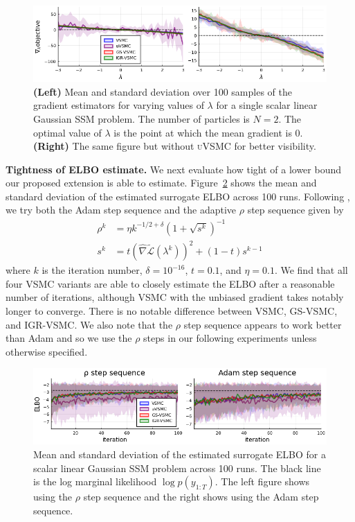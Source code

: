 \documentclass[12pt]{article}
\newcommand{\vsmc}{\textsc{VSMC}\xspace}
\newcommand{\uvsmc}{\textsc{uVSMC}\xspace}
\newcommand{\gsvsmc}{\textsc{GS-VSMC}\xspace}
\newcommand{\igrvsmc}{\textsc{IGR-VSMC}\xspace}
\newcommand{\elbo}{\textsc{ELBO}\xspace}
\newcommand{\ssm}{\textsc{SSM}\xspace}
\begin{document}
\begin{figure}[t]
\centering
\includegraphics[width=\textwidth]{figures/grad_est_var.png}
\caption{\textbf{(Left)} Mean and standard deviation over 100 samples of the gradient estimators for varying values of $\lambda$ for a single scalar linear Gaussian \ssm problem. The number of particles is $N=2$. The optimal value of $\lambda$ is the point at which the mean gradient is 0. \textbf{(Right)} The same figure but without \uvsmc for better visibility.}
\label{fig:grad_est_var}
\end{figure}

\textbf{Tightness of \elbo estimate.} We next evaluate how tight of a lower bound our proposed extension is able to estimate. Figure~\ref{fig:slgss_elbo} shows the mean and standard deviation of the estimated surrogate \elbo across 100 runs. Following \textcite{Naesseth:2018}, we try both the Adam step sequence and the adaptive $\rho$ step sequence \parencite{Kucukelbir:2017} given by
\begin{align*}
\rho^k &= \eta k^{-1/2+\delta}(1+\sqrt{s^k})^{-1} \\
s^k &= t\left(\hat{\nabla}\tilde{\mathcal{L}}(\lambda^k)\right)^2+(1-t)s^{k-1}
\end{align*}
where $k$ is the iteration number, $\delta=10^{-16}$, $t=0.1$, and $\eta=0.1$. We find that all four \vsmc variants are able to closely estimate the \elbo after a reasonable number of iterations, although \vsmc with the unbiased gradient takes notably longer to converge. There is no notable difference between \vsmc, \gsvsmc, and \igrvsmc. We also note that the $\rho$ step sequence appears to work better than Adam and so we use the $\rho$ steps in our following experiments unless otherwise specified.
\\

\begin{figure}[t]
\centering
\includegraphics[width=\textwidth]{figures/slgss_elbo.png}
\caption{Mean and standard deviation of the estimated surrogate \elbo for a scalar linear Gaussian \ssm problem across 100 runs. The black line is the log marginal likelihood $\log p(y_{1:T})$. The left figure shows using the $\rho$ step sequence and the right shows using the Adam step sequence.}
\label{fig:slgss_elbo}
\end{figure}
\end{document}
